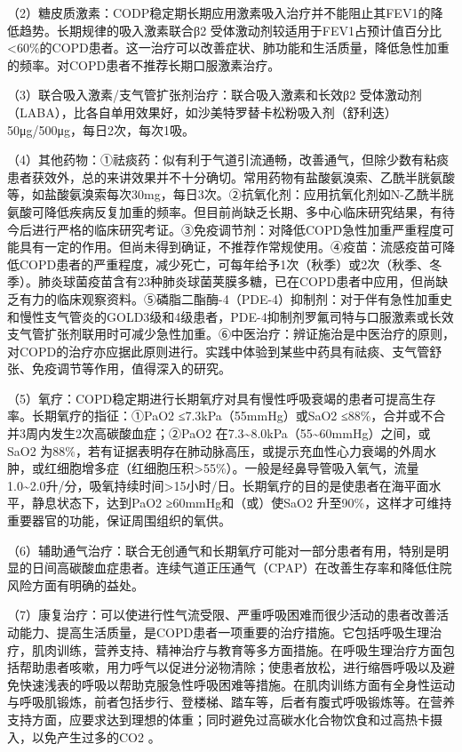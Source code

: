 （2）糖皮质激素：CODP稳定期长期应用激素吸入治疗并不能阻止其FEV1的降低趋势。长期规律的吸入激素联合β{2}
受体激动剂较适用于FEV1占预计值百分比\textless{}60\%的COPD患者。这一治疗可以改善症状、肺功能和生活质量，降低急性加重的频率。对COPD患者不推荐长期口服激素治疗。

（3）联合吸入激素/支气管扩张剂治疗：联合吸入激素和长效β{2}
受体激动剂（LABA），比各自单用效果好，如沙美特罗替卡松粉吸入剂（舒利迭）50μg/500μg，每日2次，每次1吸。

（4）其他药物：①祛痰药：似有利于气道引流通畅，改善通气，但除少数有粘痰患者获效外，总的来讲效果并不十分确切。常用药物有盐酸氨溴索、乙酰半胱氨酸等，如盐酸氨溴索每次30mg，每日3次。②抗氧化剂：应用抗氧化剂如N-乙酰半胱氨酸可降低疾病反复加重的频率。但目前尚缺乏长期、多中心临床研究结果，有待今后进行严格的临床研究考证。③免疫调节剂：对降低COPD急性加重严重程度可能具有一定的作用。但尚未得到确证，不推荐作常规使用。④疫苗：流感疫苗可降低COPD患者的严重程度，减少死亡，可每年给予1次（秋季）或2次（秋季、冬季）。肺炎球菌疫苗含有23种肺炎球菌荚膜多糖，已在COPD患者中应用，但尚缺乏有力的临床观察资料。⑤磷脂二酯酶-4（PDE-4）抑制剂：对于伴有急性加重史和慢性支气管炎的GOLD3级和4级患者，PDE-4抑制剂罗氟司特与口服激素或长效支气管扩张剂联用时可减少急性加重。⑥中医治疗：辨证施治是中医治疗的原则，对COPD的治疗亦应据此原则进行。实践中体验到某些中药具有祛痰、支气管舒张、免疫调节等作用，值得深入的研究。

（5）氧疗：COPD稳定期进行长期氧疗对具有慢性呼吸衰竭的患者可提高生存率。长期氧疗的指征：①PaO{2}
≤7.3kPa（55mmHg）或SaO{2}
≤88\%，合并或不合并3周内发生2次高碳酸血症；②PaO{2}
在7.3\textasciitilde{}8.0kPa（55\textasciitilde{}60mmHg）之间，或SaO{2}
为88\%，若有证据表明存在肺动脉高压，或提示充血性心力衰竭的外周水肿，或红细胞增多症（红细胞压积\textgreater{}55\%）。一般是经鼻导管吸入氧气，流量1.0\textasciitilde{}2.0升/分，吸氧持续时间\textgreater{}15小时/日。长期氧疗的目的是使患者在海平面水平，静息状态下，达到PaO{2}
≥60mmHg和（或）使SaO{2}
升至90\%，这样才可维持重要器官的功能，保证周围组织的氧供。

（6）辅助通气治疗：联合无创通气和长期氧疗可能对一部分患者有用，特别是明显的日间高碳酸血症患者。连续气道正压通气（CPAP）在改善生存率和降低住院风险方面有明确的益处。

（7）康复治疗：可以使进行性气流受限、严重呼吸困难而很少活动的患者改善活动能力、提高生活质量，是COPD患者一项重要的治疗措施。它包括呼吸生理治疗，肌肉训练，营养支持、精神治疗与教育等多方面措施。在呼吸生理治疗方面包括帮助患者咳嗽，用力呼气以促进分泌物清除；使患者放松，进行缩唇呼吸以及避免快速浅表的呼吸以帮助克服急性呼吸困难等措施。在肌肉训练方面有全身性运动与呼吸肌锻炼，前者包括步行、登楼梯、踏车等，后者有腹式呼吸锻炼等。在营养支持方面，应要求达到理想的体重；同时避免过高碳水化合物饮食和过高热卡摄入，以免产生过多的CO{2}
。

